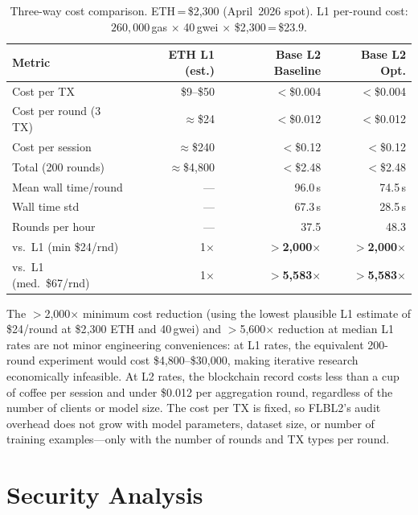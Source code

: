 \documentclass{llncs}
\begin{document}
\begin{table}[t]
\caption{Three-way cost comparison. ETH\,=\,\$2{,}300 (April~2026 spot).
  L1 per-round cost: $260{,}000$\,gas $\times$ 40\,gwei $\times$ \$2{,}300\,=\,\$23.9.}
\label{tab:costs}
\centering\footnotesize
\setlength{\tabcolsep}{3pt}
\begin{tabular}{lrrr}
\toprule
\textbf{Metric} & \textbf{ETH L1 (est.)} & \textbf{Base L2 Baseline} & \textbf{Base L2 Opt.} \\
\midrule
Cost per TX             & \$9--\$50       & $<$\$0.004    & $<$\$0.004 \\
Cost per round (3 TX)   & $\approx$\$24   & $<$\$0.012    & $<$\$0.012 \\
Cost per session        & $\approx$\$240  & $<$\$0.12     & $<$\$0.12 \\
Total (200 rounds)      & $\approx$\$4{,}800 & $<$\$2.48  & $<$\$2.48 \\
\midrule
Mean wall time/round    & ---             & 96.0\,s       & 74.5\,s \\
Wall time std           & ---             & 67.3\,s       & 28.5\,s \\
Rounds per hour         & ---             & 37.5          & 48.3 \\
\midrule
vs.\ L1 (min \$24/rnd)  & 1$\times$       & $>$\textbf{2{,}000}$\times$ & $>$\textbf{2{,}000}$\times$ \\
vs.\ L1 (med.\ \$67/rnd)& 1$\times$       & $>$\textbf{5{,}583}$\times$ & $>$\textbf{5{,}583}$\times$ \\
\bottomrule
\end{tabular}
\end{table}

The $>$2{,}000$\times$ minimum cost reduction (using the lowest plausible
L1 estimate of \$24/round at \$2{,}300 ETH and 40\,gwei) and
$>$5{,}600$\times$ reduction at median L1 rates are not minor engineering
conveniences: at L1 rates, the equivalent 200-round experiment would cost
\$4{,}800--\$30{,}000, making iterative research economically infeasible.
At L2 rates, the blockchain record costs less than a cup of coffee per
session and under \$0.012 per aggregation round, regardless of the number
of clients or model size. The cost per TX is fixed, so FLBL2's audit
overhead does not grow with model parameters, dataset size, or number of
training examples---only with the number of rounds and TX types per round.


\FloatBarrier
\section{Security Analysis}
\label{sec:security}
\end{document}

